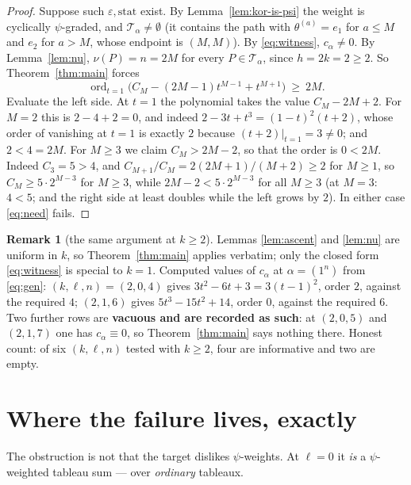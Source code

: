 \documentclass[11pt]{article}
\theoremstyle{definition}
\newtheorem{remark}[theorem]{Remark}
\DeclareMathOperator{\ord}{ord}
\newcommand{\T}{\mathcal{T}}
\begin{document}
\begin{proof}
Suppose such $\varepsilon,\mathrm{stat}$ exist. By
Lemma~\ref{lem:kor-is-psi} the weight is cyclically $\psi$-graded, and
$\T_\alpha\ne\emptyset$ (it contains the path with
$\theta^{(a)}=e_1$ for $a\le M$ and $e_2$ for $a>M$, whose endpoint is
$(M,M)$). By \eqref{eq:witness}, $c_\alpha\ne0$. By Lemma~\ref{lem:nu},
$\nu(P)=n=2M$ for every $P\in\T_\alpha$, since $h=2k=2\ge2$. So
Theorem~\ref{thm:main} forces
\begin{equation}\label{eq:need}
 \ord_{t=1}\bigl(C_M-(2M-1)t^{M-1}+t^{M+1}\bigr)\ \ge\ 2M .
\end{equation}
Evaluate the left side. At $t=1$ the polynomial takes the value
$C_M-2M+2$. For $M=2$ this is $2-4+2=0$, and indeed
$2-3t+t^{3}=(1-t)^{2}(t+2)$, whose order of vanishing at $t=1$ is exactly $2$
because $(t+2)|_{t=1}=3\ne0$; and $2<4=2M$. For $M\ge3$ we claim
$C_M>2M-2$, so that the order is $0<2M$. Indeed $C_3=5>4$, and
$C_{M+1}/C_M=2(2M+1)/(M+2)\ge2$ for $M\ge1$, so $C_M\ge5\cdot2^{M-3}$ for
$M\ge3$, while $2M-2<5\cdot2^{M-3}$ for all $M\ge3$ (at $M=3$: $4<5$; and the
right side at least doubles while the left grows by $2$). In either case
\eqref{eq:need} fails.
\end{proof}

\begin{remark}[the same argument at $k\ge2$]
Lemmas \ref{lem:ascent} and \ref{lem:nu} are uniform in $k$, so
Theorem~\ref{thm:main} applies verbatim; only the closed form
\eqref{eq:witness} is special to $k=1$. Computed values of $c_\alpha$ at
$\alpha=(1^n)$ from \eqref{eq:gen}:
$(k,\ell,n)=(2,0,4)$ gives $3t^{2}-6t+3=3(t-1)^2$, order $2$, against the
required $4$; $(2,1,6)$ gives $5t^{3}-15t^{2}+14$, order $0$, against the
required $6$. Two further rows are \textbf{vacuous and are recorded as such}:
at $(2,0,5)$ and $(2,1,7)$ one has $c_\alpha\equiv0$, so
Theorem~\ref{thm:main} says nothing there. Honest count: of six
$(k,\ell,n)$ tested with $k\ge2$, four are informative and two are empty.
\end{remark}

\section{Where the failure lives, exactly}

The obstruction is not that the target dislikes $\psi$-weights. At $\ell=0$ it
\emph{is} a $\psi$-weighted tableau sum --- over \emph{ordinary} tableaux.
\end{document}
